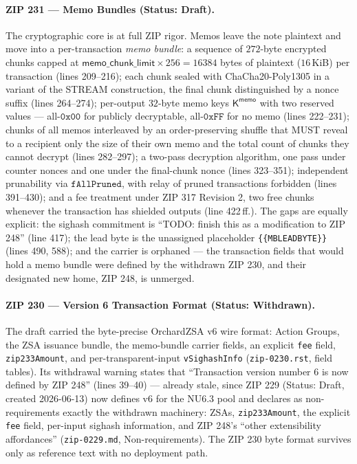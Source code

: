 \documentclass[11pt,a4paper]{article}
\theoremstyle{definition}
\begin{document}
\paragraph{ZIP 231 --- Memo Bundles (Status: Draft).}
The cryptographic core is at full ZIP rigor. Memos leave the note plaintext
and move into a per-transaction \emph{memo bundle}: a sequence of $272$-byte
encrypted chunks capped at
$\mathsf{memo\_chunk\_limit} \times 256 = 16384$ bytes of plaintext
($16$\,KiB) per transaction (lines 209--216); each chunk sealed with
ChaCha20-Poly1305 in a variant of the STREAM construction, the final chunk
distinguished by a nonce suffix (lines 264--274); per-output $32$-byte memo
keys $\mathsf{K^{memo}}$ with two reserved values --- all-$\mathtt{0x00}$
for publicly decryptable, all-$\mathtt{0xFF}$ for no memo (lines 222--231);
chunks of all memos interleaved by an order-preserving shuffle that MUST
reveal to a recipient only the size of their own memo and the total count of
chunks they cannot decrypt (lines 282--297); a two-pass decryption
algorithm, one pass under counter nonces and one under the final-chunk nonce
(lines 323--351); independent prunability via $\mathtt{fAllPruned}$, with
relay of pruned transactions forbidden (lines 391--430); and a fee treatment
under ZIP 317 Revision 2, two free chunks whenever the transaction has
shielded outputs (line 422\,ff.). The gaps are equally explicit: the sighash
commitment is ``TODO: finish this as a modification to ZIP 248'' (line 417);
the lead byte is the unassigned placeholder \texttt{\{\{MBLEADBYTE\}\}}
(lines 490, 588); and the carrier is orphaned --- the transaction fields
that would hold a memo bundle were defined by the withdrawn ZIP 230, and
their designated new home, ZIP 248, is unmerged.

\paragraph{ZIP 230 --- Version 6 Transaction Format (Status: Withdrawn).}
The draft carried the byte-precise OrchardZSA v6 wire format: Action Groups,
the ZSA issuance bundle, the memo-bundle carrier fields, an explicit
\texttt{fee} field, \texttt{zip233Amount}, and per-transparent-input
\texttt{vSighashInfo} (\texttt{zip-0230.rst}, field tables). Its withdrawal
warning states that ``Transaction version number 6 is now defined by
ZIP 248'' (lines 39--40) --- already stale, since ZIP 229 (Status: Draft,
created 2026-06-13) now defines v6 for the NU6.3 pool and declares as
non-requirements exactly the withdrawn machinery: ZSAs,
\texttt{zip233Amount}, the explicit \texttt{fee} field, per-input sighash
information, and ZIP 248's ``other extensibility affordances''
(\texttt{zip-0229.md}, Non-requirements). The ZIP 230 byte format survives
only as reference text with no deployment path.
\end{document}
